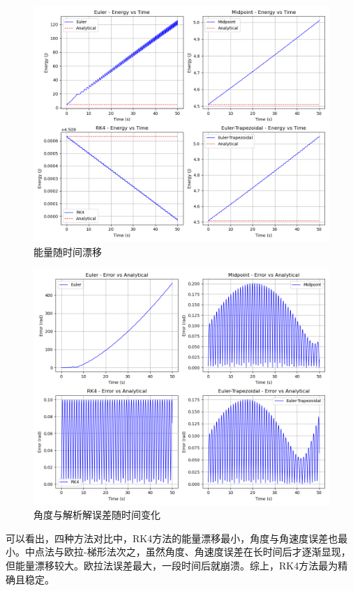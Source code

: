 \begin{figure}[H]
    \centering
    \includegraphics[width=1.0\textwidth]{Problem_1/figs/energy_time.png}
    \caption{能量随时间漂移}
\end{figure}
\begin{figure}[H]
    \centering
    \includegraphics[width=1.0\textwidth]{Problem_1/figs/angle_error_time.png}
    \caption{角度与解析解误差随时间变化}
\end{figure}
可以看出，四种方法对比中，RK4方法的能量漂移最小，角度与角速度误差也最小。中点法与欧拉-梯形法次之，虽然角度、角速度误差在长时间后才逐渐显现，但能量漂移较大。欧拉法误差最大，一段时间后就崩溃。综上，RK4方法最为精确且稳定。